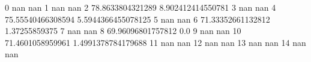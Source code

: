 0 nan nan
1 nan nan
2 78.8633804321289 8.902412414550781
3 nan nan
4 75.55540466308594 5.5944366455078125
5 nan nan
6 71.33352661132812 1.37255859375
7 nan nan
8 69.96096801757812 0.0
9 nan nan
10 71.4601058959961 1.4991378784179688
11 nan nan
12 nan nan
13 nan nan
14 nan nan
